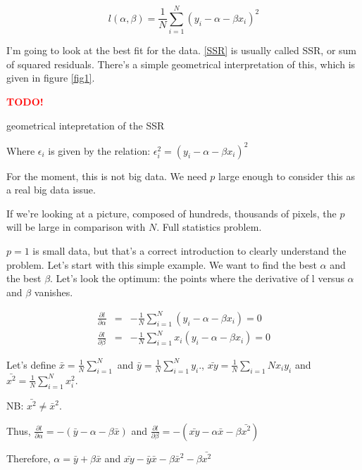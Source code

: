 \documentclass[a4paper]{tufte-book}
\newcommand{\TODO}{\textcolor{red}{\bf TODO!}\xspace}
\begin{document}
\begin{equation}
l(\alpha,\beta) = \frac{1}{N} \sum_{i=1}^N (y_i - \alpha - \beta x_i )^2
\label{SSR}
\end{equation}

I’m going to look at the best fit for the data. \ref{SSR} is usually called SSR, or sum of squared residuals.
There’s a simple geometrical interpretation of this, which is given in figure \ref{fig1}.

\begin{marginfigure}
\TODO
\caption{geometrical intepretation of the SSR}
\label{fig1}
\end{marginfigure}

Where $\epsilon_i$ is given by the relation: $\epsilon_i^2 = (y_i - \alpha - \beta x_i)^2$

For the moment, this is not big data. We need $p$ large enough to consider this as a real big data issue.

If we’re looking at a picture, composed of hundreds, thousands of pixels, the $p$ will be large in comparison with $N$. Full statistics problem.

$p=1$ is small data, but that’s a correct introduction to clearly understand the problem. Let’s start with this simple example.
We want to find the best $\alpha$ and the best $\beta$. Let’s look the optimum: the points where the derivative of l versus $\alpha$ and $\beta$ vanishes.

\begin{eqnarray}
\frac{\partial l}{\partial \alpha} & = & - \frac{1}{N} \sum_{i=1}^N (y_i - \alpha - \beta x_i) = 0\\
\frac{\partial l}{\partial \beta} & =&  -\frac{1}{N} \sum_{i=1}^N x_i (y_i - \alpha -  \beta x_i) = 0
\end{eqnarray}




Let’s define $\bar{x} = \frac{1}{N} \sum_{i=1}^N$ and $\bar{y} = \frac{1}{N} \sum_{i=1}^N y_i$., $\bar{xy} = \frac{1}{N} \sum_{i=1}{N} x_i y_i$ and
$\bar{x^2} = \frac{1}{N} \sum_{i=1}^N x_i^2$.

NB: $\bar{x^2} \neq \bar{x}^2$.

Thus, $\frac{\partial l}{\partial \alpha} = - (\bar{y} - \alpha - \beta \bar{x})$ and $\frac{\partial l}{\partial \beta} = - (\bar{xy} - \alpha
\bar{x} - \beta \bar{x^2})$

Therefore, $\alpha = \bar{y} + \beta \bar{x}$
and $\bar{xy} -\bar{y}\bar{x} - \beta \bar{x}^2 - \beta \bar{x^2}$
\end{document}
